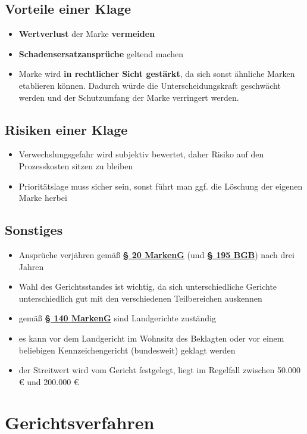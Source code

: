 \documentclass[12pt,A4]{extarticle}
\newcommand{\markenG}[2][]{\textbf{\textcolor{markenGesetzLink}{\href{https://www.gesetze-im-internet.de/markeng/__#2.html}{§ #2 \ifthenelse{\equal{#1}{}}{}{#1 }MarkenG}}}}
\newcommand{\bgb}[2][]{\textbf{\textcolor{markenGesetzLink}{\href{https://www.gesetze-im-internet.de/bgb/__#2.html}{§ #2 \ifthenelse{\equal{#1}{}}{}{#1 }BGB}}}}
\begin{document}
\subsection{Vorteile einer Klage}
\begin{itemize}
  \item{\textbf{Wertverlust} der Marke \textbf{vermeiden}}
  \item{\textbf{Schadensersatzansprüche} geltend machen}
  \item{Marke wird \textbf{in rechtlicher Sicht gestärkt}, da sich sonst ähnliche Marken etablieren können. Dadurch würde die Unterscheidungskraft geschwächt werden und der Schutzumfang der Marke verringert werden.}
\end{itemize}

\subsection{Risiken einer Klage}
\begin{itemize}
  \item{Verwechslungsgefahr wird subjektiv bewertet, daher Risiko auf den Prozesskosten sitzen zu bleiben}
  \item{Prioritätslage muss sicher sein, sonst führt man ggf. die Löschung der eigenen Marke herbei}
\end{itemize}

\subsection{Sonstiges}
\begin{itemize}
  \item{Ansprüche verjähren gemäß \markenG{20} (und \bgb{195}) nach drei Jahren}
  \item{Wahl des Gerichtsstandes ist wichtig, da sich unterschiedliche Gerichte unterschiedlich gut mit den verschiedenen Teilbereichen auskennen}
  \item{gemäß \markenG{140} sind Landgerichte zuständig}
  \item{es kann vor dem Landgericht im Wohnsitz des Beklagten oder vor einem beliebigen Kennzeichengericht (bundesweit) geklagt werden}
  \item{der Streitwert wird vom Gericht festgelegt, liegt im Regelfall zwischen 50.000 € und 200.000 €}
\end{itemize}

\section{Gerichtsverfahren}
\end{document}
